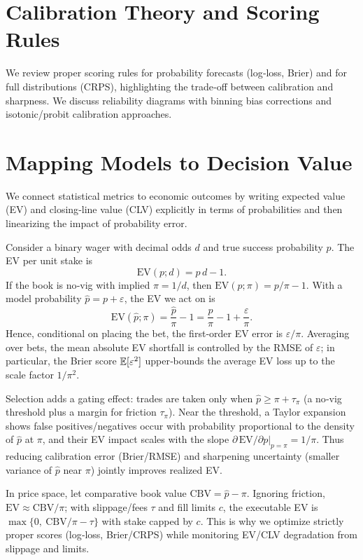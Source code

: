 \section{Calibration Theory and Scoring Rules}
We review proper scoring rules for probability forecasts (log‑loss, Brier) and for full distributions (CRPS), highlighting the trade‑off between calibration and sharpness. We discuss reliability diagrams with binning bias corrections and isotonic/probit calibration approaches.

\section{Mapping Models to Decision Value}
We connect statistical metrics to economic outcomes by writing expected value (EV) and closing‑line value (CLV) explicitly in terms of probabilities and then linearizing the impact of probability error.

Consider a binary wager with decimal odds $d$ and true success probability $p$. The EV per unit stake is
\[\mathrm{EV}(p;d)=p\,d-1.\]
If the book is no‑vig with implied $\pi=1/d$, then $\mathrm{EV}(p;\pi)=p/\pi-1$. With a model probability $\hat p=p+\varepsilon$, the EV we act on is
\[\mathrm{EV}(\hat p;\pi)=\frac{\hat p}{\pi}-1=\frac{p}{\pi}-1+\frac{\varepsilon}{\pi}.\]
Hence, conditional on placing the bet, the first‑order EV error is $\varepsilon/\pi$. Averaging over bets, the mean absolute EV shortfall is controlled by the RMSE of $\varepsilon$; in particular, the Brier score $\mathbb{E}[\varepsilon^2]$ upper‑bounds the average EV loss up to the scale factor $1/\pi^2$.

Selection adds a gating effect: trades are taken only when $\hat p\ge \pi+\tau_\pi$ (a no‑vig threshold plus a margin for friction $\tau_\pi$). Near the threshold, a Taylor expansion shows false positives/negatives occur with probability proportional to the density of $\hat p$ at $\pi$, and their EV impact scales with the slope $\partial\,\mathrm{EV}/\partial p\big|_{p=\pi}=1/\pi$. Thus reducing calibration error (Brier/RMSE) and sharpening uncertainty (smaller variance of $\hat p$ near $\pi$) jointly improves realized EV.

In price space, let comparative book value $\mathrm{CBV}=\hat p-\pi$. Ignoring friction, $\mathrm{EV}\approx \mathrm{CBV}/\pi$; with slippage/fees $\tau$ and fill limits $c$, the executable EV is $\max\{0,\ \mathrm{CBV}/\pi-\tau\}$ with stake capped by $c$. This is why we optimize strictly proper scores (log‑loss, Brier/CRPS) while monitoring EV/CLV degradation from slippage and limits.

